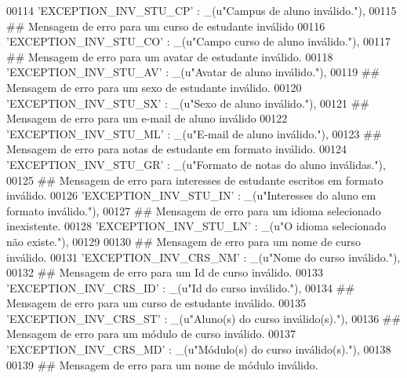 \begin{DoxyCode}
00114     \textcolor{stringliteral}{'EXCEPTION\_INV\_STU\_CP'} : \_(\textcolor{stringliteral}{u"Campus de aluno inválido."}),
00115     \textcolor{comment}{## Mensagem de erro para um curso de estudante inválido}
00116     \textcolor{stringliteral}{'EXCEPTION\_INV\_STU\_CO'} : \_(\textcolor{stringliteral}{u"Campo curso de aluno inválido."}),
00117     \textcolor{comment}{## Mensagem de erro para um avatar de estudante inválido.}
00118     \textcolor{stringliteral}{'EXCEPTION\_INV\_STU\_AV'} : \_(\textcolor{stringliteral}{u"Avatar de aluno inválido."}),
00119     \textcolor{comment}{## Mensagem de erro para um sexo de estudante inválido.}
00120     \textcolor{stringliteral}{'EXCEPTION\_INV\_STU\_SX'} : \_(\textcolor{stringliteral}{u"Sexo de aluno inválido."}),
00121     \textcolor{comment}{## Mensagem de erro para um e-mail de aluno inválido}
00122     \textcolor{stringliteral}{'EXCEPTION\_INV\_STU\_ML'} : \_(\textcolor{stringliteral}{u"E-mail de aluno inválido."}),
00123     \textcolor{comment}{## Mensagem de erro para notas de estudante em formato inválido.}
00124     \textcolor{stringliteral}{'EXCEPTION\_INV\_STU\_GR'} : \_(\textcolor{stringliteral}{u"Formato de notas do aluno inválidas."}),
00125     \textcolor{comment}{## Mensagem de erro para interesses de estudante escritos em formato inválido.}
00126     \textcolor{stringliteral}{'EXCEPTION\_INV\_STU\_IN'} : \_(\textcolor{stringliteral}{u"Interesses do aluno em formato inválido."}),
00127     \textcolor{comment}{## Mensagem de erro para um idioma selecionado inexistente.}
00128     \textcolor{stringliteral}{'EXCEPTION\_INV\_STU\_LN'} : \_(\textcolor{stringliteral}{u"O idioma selecionado não existe."}),
00129 
00130     \textcolor{comment}{## Mensagem de erro para um nome de curso inválido.}
00131     \textcolor{stringliteral}{'EXCEPTION\_INV\_CRS\_NM'} : \_(\textcolor{stringliteral}{u"Nome do curso inválido."}),
00132     \textcolor{comment}{## Mensagem de erro para um Id de curso inválido.}
00133     \textcolor{stringliteral}{'EXCEPTION\_INV\_CRS\_ID'} : \_(\textcolor{stringliteral}{u"Id do curso inválido."}),
00134     \textcolor{comment}{## Mensagem de erro para um curso de estudante inválido.}
00135     \textcolor{stringliteral}{'EXCEPTION\_INV\_CRS\_ST'} : \_(\textcolor{stringliteral}{u"Aluno(s) do curso inválido(s)."}),
00136     \textcolor{comment}{## Mensagem de erro para um módulo de curso inválido.}
00137     \textcolor{stringliteral}{'EXCEPTION\_INV\_CRS\_MD'} : \_(\textcolor{stringliteral}{u"Módulo(s) do curso inválido(s)."}),
00138 
00139     \textcolor{comment}{## Mensagem de erro para um nome de módulo inválido.}

\end{DoxyCode}
